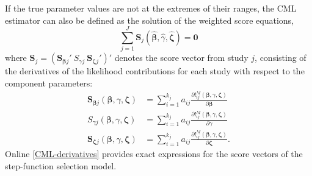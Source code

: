 \documentclass[
  american,
  man, donotrepeattitle,floatsintext]{apa7}
\begin{document}
If the true parameter values are not at the extremes of their ranges, the CML estimator can also be defined as the solution of the weighted score equations,
\begin{equation}
\sum_{j=1}^J \mathbf{S}_{j}\left(\boldsymbol{\hat\beta}, \hat\gamma, \boldsymbol{\hat\zeta}\right) = \mathbf{0}
\end{equation}
where \(\mathbf{S}_j = \left(\mathbf{S}_{\boldsymbol\beta j}' \  S_{\gamma j} \ \mathbf{S}_{\boldsymbol\zeta j}'\right)'\) denotes the score vector from study \(j\), consisting of the derivatives of the likelihood contributions for each study with respect to the component parameters:
\begin{align}
\mathbf{S}_{\boldsymbol\beta j}\left(\boldsymbol{\beta}, \gamma, \boldsymbol{\zeta}\right) &= \sum_{i=1}^{k_j} a_{ij} \frac{\partial l^M_{ij}\left(\boldsymbol\beta, \gamma, \boldsymbol\zeta\right)}{\partial \boldsymbol\beta} \label{eq:score-M-beta} \\
S_{\gamma j}\left(\boldsymbol{\beta}, \gamma, \boldsymbol{\zeta}\right) &= \sum_{i=1}^{k_j} a_{ij} \frac{\partial l^M_{ij}\left(\boldsymbol\beta, \gamma, \boldsymbol\zeta\right)}{\partial \gamma} \label{eq:score-M-gamma} \\
\mathbf{S}_{\boldsymbol\zeta j}\left(\boldsymbol{\beta}, \gamma, \boldsymbol{\zeta}\right) &= \sum_{i=1}^{k_j} a_{ij} \frac{\partial l^M_{ij}\left(\boldsymbol\beta, \gamma, \boldsymbol\zeta\right)}{\partial \boldsymbol\zeta}. \label{eq:score-M-zeta} 
\end{align}
Online \ref{CML-derivatives} provides exact expressions for the score vectors of the step-function selection model.
\end{document}
